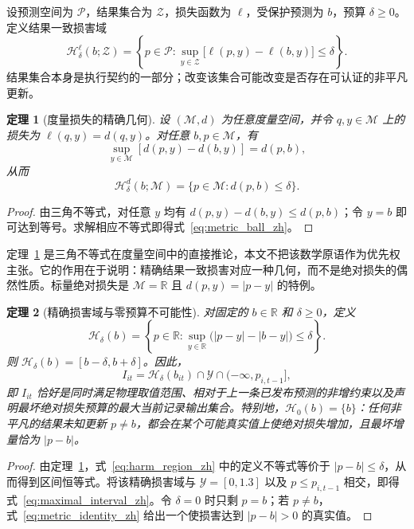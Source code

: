 \documentclass[UTF8,11pt]{ctexart}
\newtheorem{theorem}{定理}
\newcommand{\R}{\mathbb{R}}
\begin{document}
设预测空间为 $\mathcal P$，结果集合为 $\mathcal Z$，损失函数为 $\ell$，受保护预测为 $b$，预算 $\delta\geq0$。定义结果一致损害域
\begin{equation}
  \mathcal H^{\ell}_{\delta}(b;\mathcal Z)
  =\left\{p\in\mathcal P:
  \sup_{y\in\mathcal Z}\bigl[\ell(p,y)-\ell(b,y)\bigr]\leq\delta
  \right\}.
  \label{eq:generic_harm_region_zh}
\end{equation}
结果集合本身是执行契约的一部分；改变该集合可能改变是否存在可认证的非平凡更新。

\begin{theorem}[度量损失的精确几何]
\label{thm:metric_harm_zh}
设 $(\mathcal M,d)$ 为任意度量空间，并令 $q,y\in\mathcal M$ 上的损失为 $\ell(q,y)=d(q,y)$。对任意 $b,p\in\mathcal M$，有
\begin{equation}
  \sup_{y\in\mathcal M}\left[d(p,y)-d(b,y)\right]=d(p,b),
  \label{eq:metric_identity_zh}
\end{equation}
从而
\begin{equation}
  \mathcal H^{d}_{\delta}(b;\mathcal M)
  =\{p\in\mathcal M:d(p,b)\leq\delta\}.
  \label{eq:metric_ball_zh}
\end{equation}
\end{theorem}
\begin{proof}
由三角不等式，对任意 $y$ 均有 $d(p,y)-d(b,y)\leq d(p,b)$；令 $y=b$ 即可达到等号。求解相应不等式即得式~\eqref{eq:metric_ball_zh}。
\end{proof}

定理~\ref{thm:metric_harm_zh} 是三角不等式在度量空间中的直接推论，本文不把该数学原语作为优先权主张。它的作用在于说明：精确结果一致损害对应一种几何，而不是绝对损失的偶然性质。标量绝对损失是 $\mathcal M=\R$ 且 $d(p,y)=|p-y|$ 的特例。

\begin{theorem}[精确损害域与零预算不可能性]
\label{thm:harm_region_zh}
对固定的 $b\in\R$ 和 $\delta\geq0$，定义
\begin{equation}
  \mathcal H_\delta(b)=\left\{p\in\R:
  \sup_{y\in\R}\bigl(|p-y|-|b-y|\bigr)\leq\delta\right\}.
  \label{eq:harm_region_zh}
\end{equation}
则 $\mathcal H_\delta(b)=[b-\delta,b+\delta]$。因此，
\begin{equation}
  I_{it}=\mathcal H_\delta(b_{it})\cap\mathcal Y
  \cap(-\infty,p_{i,t-1}],
  \label{eq:maximal_interval_zh}
\end{equation}
即 $I_{it}$ 恰好是同时满足物理取值范围、相对于上一条已发布预测的非增约束以及声明最坏绝对损失预算的最大当前记录输出集合。特别地，$\mathcal H_0(b)=\{b\}$：任何非平凡的结果未知更新 $p\neq b$，都会在某个可能真实值上使绝对损失增加，且最坏增量恰为 $|p-b|$。
\end{theorem}
\begin{proof}
由定理~\ref{thm:metric_harm_zh}，式~\eqref{eq:harm_region_zh} 中的定义不等式等价于 $|p-b|\leq\delta$，从而得到区间恒等式。将该精确损害域与 $\mathcal Y=[0,1.3]$ 以及 $p\leq p_{i,t-1}$ 相交，即得式~\eqref{eq:maximal_interval_zh}。令 $\delta=0$ 时只剩 $p=b$；若 $p\neq b$，式~\eqref{eq:metric_identity_zh} 给出一个使损害达到 $|p-b|>0$ 的真实值。
\end{proof}
\end{document}
